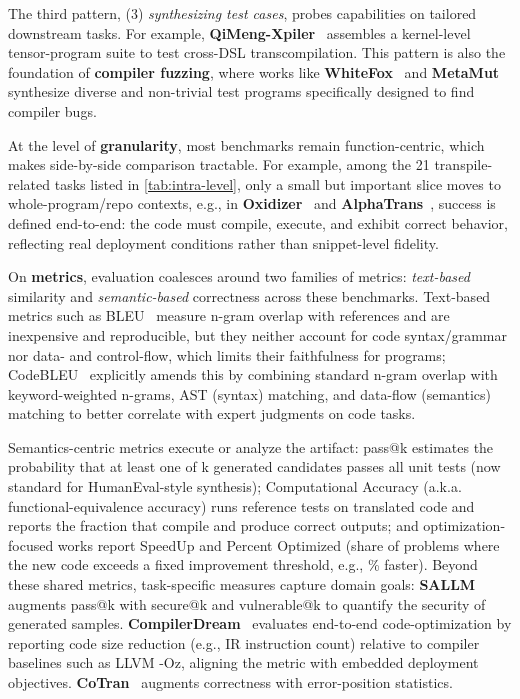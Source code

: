 \documentclass[pdflatex,sn-mathphys-ay,twocolumn, a4paper]{sn-jnl}%
\theoremstyle{thmstyleone}%
\theoremstyle{thmstyletwo}%
\theoremstyle{thmstylethree}%
\begin{document}
The third pattern, (3) \textit{synthesizing test cases}, probes capabilities on tailored downstream tasks. For example, \textbf{QiMeng-Xpiler}~\citep{10_qimengxpiler2025_osdi} assembles a kernel-level tensor-program suite to test cross-DSL transcompilation.
This pattern is also the foundation of \textbf{compiler fuzzing}, where works like \textbf{WhiteFox}~\citep{31_yang2024whitefox} and \textbf{MetaMut}~\citep{76_ou2024mutators_asplos} synthesize diverse and non-trivial test programs specifically designed to find compiler bugs.

At the level of \textbf{granularity}, most benchmarks remain function-centric, which makes side-by-side comparison tractable. For example, among the 21 transpile-related tasks listed in \autoref{tab:intra-level}, only a small but important slice moves to whole-program/repo contexts, e.g., in \textbf{Oxidizer}~\citep{60_zhang2025_pldi} and \textbf{AlphaTrans}~\citep{91_alphatrans2025_fse}, success is defined end-to-end: the code must compile, execute, and exhibit correct behavior, reflecting real deployment conditions rather than snippet-level fidelity.

On \textbf{metrics}, evaluation coalesces around two families of metrics: \textit{text-based} similarity and \textit{semantic-based} correctness across these benchmarks. Text-based metrics such as BLEU~\citep{bleu} measure n-gram overlap with references and are inexpensive and reproducible, but they neither account for code syntax/grammar nor data- and control-flow, which limits their faithfulness for programs; CodeBLEU~\citep{codebleu} explicitly amends this by combining standard n-gram overlap with keyword-weighted n-grams, AST (syntax) matching, and data-flow (semantics) matching to better correlate with expert judgments on code tasks. 

Semantics-centric metrics execute or analyze the artifact: pass@k estimates the probability that at least one of k generated candidates passes all unit tests (now standard for HumanEval-style synthesis); Computational Accuracy (a.k.a. functional-equivalence accuracy) runs reference tests on translated code and reports the fraction that compile and produce correct outputs; and optimization-focused works report SpeedUp and Percent Optimized (share of problems where the new code exceeds a fixed improvement threshold, e.g., \% faster). Beyond these shared metrics, task-specific measures capture domain goals: \textbf{SALLM}~\citep{146_sallm_asew} augments pass@k with secure@k and vulnerable@k to quantify the security of generated samples. \textbf{CompilerDream}~\citep{11_deng2024compilerdream_arxiv} evaluates end-to-end code-optimization by reporting code size reduction (e.g., IR instruction count) relative to compiler baselines such as LLVM -Oz, aligning the metric with embedded deployment objectives. \textbf{CoTran}~\citep{38_jana2024cotran} augments correctness with error-position statistics.
\end{document}
